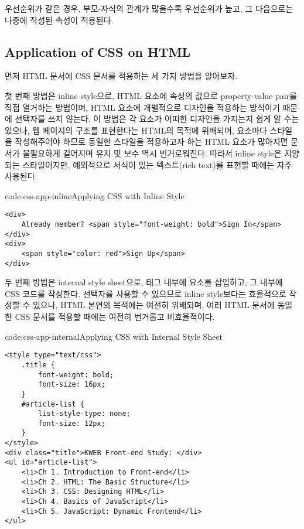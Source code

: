 우선순위가 같은 경우, 부모-자식의 관계가 많을수록 우선순위가 높고, 그 다음으로는 나중에 작성된 속성이 적용된다.

\subsection*{Application of CSS on HTML}
먼저 HTML 문서에 CSS 문서를 적용하는 세 가지 방법을 알아보자.

첫 번째 방법은 inline style으로, HTML 요소에  속성의 값으로 property-value pair를 직접 열거하는 방법이며, HTML 요소에 개별적으로 디자인을 적용하는 방식이기 때문에 선택자를 쓰지 않는다. 이 방법은 각 요소가 어떠한 디자인을 가지는지 쉽게 알 수는 있으나, 웹 페이지의 구조를 표현한다는 HTML의 목적에 위배되며, 요소마다 스타일을 작성해주어야 하므로 동일한 스타일을 적용하고자 하는 HTML 요소가 많아지면 문서가 불필요하게 길어지며 유지 및 보수 역시 번거로워진다. 따라서 inline style은 지양되는 스타일이지만, 예외적으로 서식이 있는 텍스트(rich text)를 표현할 때에는 자주 사용된다.

\begin{codeenv}{code:css-app-inline}{Applying CSS with Inline Style}\begin{verbatim}
<div>
    Already member? <span style="font-weight: bold">Sign In</span>
</div>
<div>
    <span style="color: red">Sign Up</span>
</div>
\end{verbatim}
\end{codeenv}

두 번째 방법은 internal style sheet으로,  태그 내부에  요소를 삽입하고, 그 내부에 CSS 코드를 작성한다. 선택자를 사용할 수 있으므로 inline style보다는 효율적으로 작성할 수 있으나, HTML 본연의 목적에는 여전히 위배되며, 여러 HTML 문서에 동일한 CSS 문서를 적용할 때에는 여전히 번거롭고 비효율적이다.

\begin{codeenv}{code:css-app-internal}{Applying CSS with Internal Style Sheet}\begin{verbatim}
<style type="text/css">
    .title {
        font-weight: bold;
        font-size: 16px;
    }
    #article-list {
        list-style-type: none;
        font-size: 12px;
    }
</style>
<div class="title">KWEB Front-end Study: </div>
<ul id="article-list">
    <li>Ch 1. Introduction to Front-end</li>
    <li>Ch 2. HTML: The Basic Structure</li>
    <li>Ch 3. CSS: Designing HTML</li>
    <li>Ch 4. Basics of JavaScript</li>
    <li>Ch 5. JavaScript: Dynamic Frontend</li>
</ul>
\end{verbatim}
\end{codeenv}


